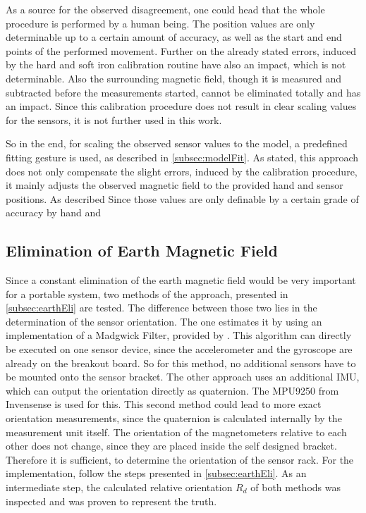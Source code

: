 As a source for the observed disagreement, one could head that the whole procedure is performed by a human being. The position values are only determinable up to a certain amount of accuracy, as well as the start and end points of the performed movement. Further on the already stated errors, induced by the hard and soft iron calibration routine have also an impact, which is not determinable. Also the surrounding magnetic field, though it is measured and subtracted before the measurements started, cannot be eliminated totally and has an impact. Since this calibration procedure does not result in clear scaling values for the sensors, it is not further used in this work. 

So in the end, for scaling the observed sensor values to the model, a predefined fitting gesture is used, as described in \ref{subsec:modelFit}. As stated, this approach does not only compensate the slight errors, induced by the calibration procedure, it mainly adjusts the observed magnetic field to the provided hand and sensor positions. As described Since those values are only definable by a certain grade of accuracy by hand and  


\subsection{Elimination of Earth Magnetic Field} \label{subsec:resEarthEli}

Since a constant elimination of the earth magnetic field would be very important for a portable system, two methods of the approach, presented in \ref{subsec:earthEli} are tested. The difference between those two lies in the determination of the sensor orientation. The one estimates it by using an implementation of a Madgwick Filter, provided by \cite{mikeshub2012}. This algorithm can directly be executed on one sensor device, since the accelerometer and the gyroscope are already on the breakout board. So for this method, no additional sensors have to be mounted onto the sensor bracket. The other approach uses an additional \ac{IMU}, which can output the orientation directly as quaternion. The MPU9250 from Invensense \cite{MPU2014} is used for this. This second method could lead to more exact orientation measurements, since the quaternion is calculated internally by the measurement unit itself. The orientation of the magnetometers relative to each other does not change, since they are placed inside the self designed bracket. Therefore it is sufficient, to determine the orientation of the sensor rack. For the implementation, follow the steps presented in \ref{subsec:earthEli}. As an intermediate step, the calculated relative orientation $ R_{d} $ of both methods was inspected and was proven to represent the truth.

